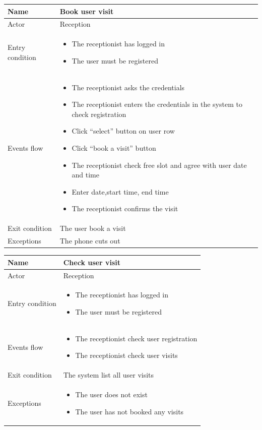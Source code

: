 \begin{tabular}{|p{5cm} | p{7cm} | }
	\hline
	Name & Book user visit  \\
	\hline
	Actor & Reception \\
	\hline
	Entry condition &
	\begin{itemize}
		\item The receptionist has logged in 
		\item The user must be registered
	\end{itemize} \\
	\hline
	Events flow & 
	\begin{itemize}
		\item The receptionist asks the credentials
		\item The receptionist enters the credentials in the system to check registration
		\item Click “select” button on user row
		\item Click “book a visit” button 
		\item The receptionist check free slot and agree with user date and time
		\item Enter date,start time, end time
		\item The receptionist confirms the visit
	\end{itemize} \\
	\hline
	Exit condition &
	The user book a visit\\
	\hline 
	Exceptions & 
	The phone cuts out \\
	\hline
\end{tabular}
 
 \begin{tabular}{|p{5cm} | p{7cm} | }
 	\hline
 	Name & Check user visit  \\
 	\hline
 	Actor & Reception \\
 	\hline
 	Entry condition &
 	\begin{itemize}
 		\item The receptionist has logged in 
 		\item The user must be registered
 	\end{itemize} \\
 	\hline
 	Events flow & 
 	\begin{itemize}
 		\item The receptionist check user registration
 		\item The receptionist check user visits
 	\end{itemize} \\
 	\hline
 	Exit condition &
 	The system list all user visits \\
 	\hline 
 	Exceptions & 
 	\begin{itemize}
 		\item The user does not exist
 		\item The user has not booked any visits
 	\end{itemize} \\
 	\hline
 \end{tabular}


